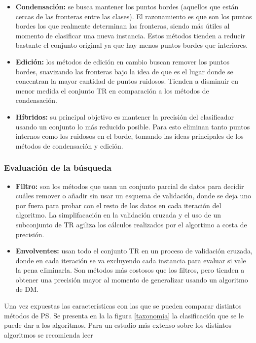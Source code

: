 \begin{itemize}
\item \textbf{Condensación:}
se busca mantener los puntos bordes (aquellos que están cercas de las fronteras entre las clases). El razonamiento es que son los puntos bordes los que realmente determinan las fronteras, siendo más útiles al momento de clasificar una nueva instancia. Estos métodos tienden a reducir bastante el conjunto original ya que hay menos puntos bordes que interiores.

\item \textbf{Edición:}
los métodos de edición en cambio buscan remover los puntos bordes, suavizando las fronteras bajo la idea de que es el lugar donde se concentran la mayor cantidad de puntos ruidosos. Tienden a disminuir en menor medida el conjunto TR en comparación a los métodos de condensación.

\item \textbf{Híbridos:}
su principal objetivo es mantener la precisión del clasificador usando un conjunto lo más reducido posible. Para esto eliminan tanto puntos internos como los ruidosos en el borde, tomando las ideas principales de los métodos de condensación y edición.
\end{itemize}

\subsubsection{Evaluación de la búsqueda}

\begin{itemize}
\item \textbf{Filtro:}
son los métodos que usan un conjunto parcial de datos para decidir cuáles remover o añadir sin usar un esquema de validación, donde se deja uno por fuera para probar con el resto de los datos en cada iteración del algoritmo. La simplifacación en la validación cruzada y el uso de un subconjunto de TR agiliza los cálculos realizados por el algortimo a costa de precisión.

\item \textbf{Envolventes:}
usan todo el conjunto TR en un proceso de validación cruzada, donde en cada iteración se va excluyendo cada instancia para evaluar si vale la pena eliminarla. Son métodos más costosos que los filtros, pero tienden a obtener una precisión mayor al momento de generalizar usando un algoritmo de DM.
\end{itemize}

Una vez expuestas las características con las que se pueden comparar distintos métodos de PS. Se presenta en la la figura \ref{taxonomia} la clasificación que se le puede dar a los algoritmos. Para un estudio más extenso sobre los distintos algoritmos se recomienda leer \cite{garcia2016data}

